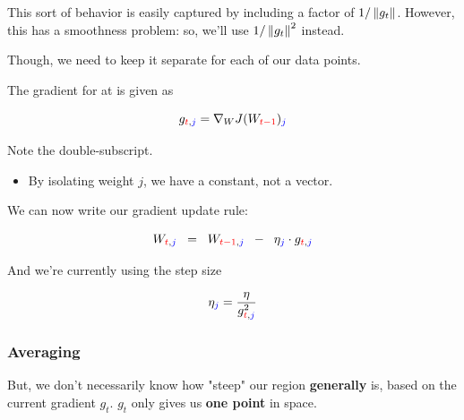             This sort of behavior is easily captured by including a factor of $1/\left\lVert g_t\right\rVert$. However, this has a smoothness problem: so, we'll use $1/\left\lVert g_t\right\rVert^2$ instead.

            Though, we need to keep it separate for each of our data points.\\

            \begin{notation}
                The gradient for  at  is given as 

                \begin{equation*}
                    g_{\textcolor{red}{t},\textcolor{blue}{j}} = \nabla_W J(W_{\textcolor{red}{t-1}})_{\textcolor{blue}{j}}
                \end{equation*}

                Note the double-subscript.

                \phantom{}

                \begin{itemize}
                    \item By isolating weight $j$, we have a constant, not a vector.
                \end{itemize}
            \end{notation}

            We can now write our gradient update rule:

            \begin{equation}
                W_{\textcolor{red}{t},\textcolor{blue}{j}} \;\;=\;\; 
                W_{\textcolor{red}{t-1},\textcolor{blue}{j}} \;\;-\;\; 
                \eta_{\textcolor{blue}{j}} \cdot g_{\textcolor{red}{t},\textcolor{blue}{j}}
            \end{equation}

            And we're currently using the step size

            \begin{equation}
                \eta_{\textcolor{blue}{j}} = \frac{\eta}{g_{\textcolor{red}{t},\textcolor{blue}{j}}^2}
            \end{equation}

        \phantom{}

        \subsubsection{Averaging}

            But, we don't necessarily know how "steep" our region \textbf{generally} is, based on the current gradient $g_t$. $g_t$ only gives us \textbf{one point} in space.
            
